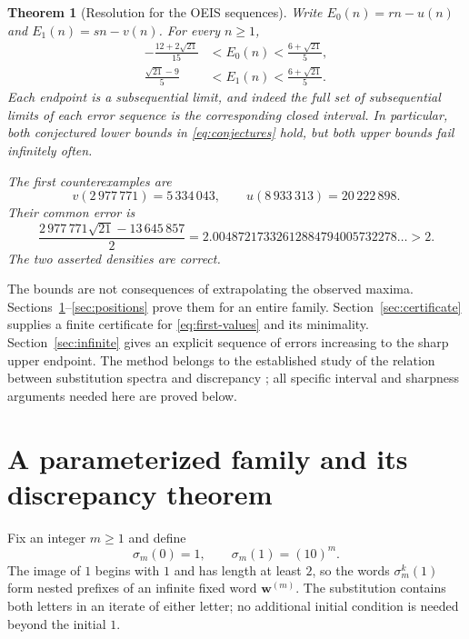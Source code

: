\documentclass[11pt]{article}
\numberwithin{equation}{section}
\newtheorem{theorem}{Theorem}[section]
\theoremstyle{definition}
\theoremstyle{remark}
\newcommand{\word}{\mathbf{w}}
\begin{document}
\begin{theorem}[Resolution for the OEIS sequences]\label{thm:original}
Write $E_0(n)=rn-u(n)$ and $E_1(n)=sn-v(n)$. For every $n\ge1$,
\begin{align}
-\frac{12+2\sqrt{21}}{15}&<E_0(n)<\frac{6+\sqrt{21}}5,\label{eq:zero3}\\
\frac{\sqrt{21}-9}{5}&<E_1(n)<\frac{6+\sqrt{21}}5.\label{eq:one3}
\end{align}
Each endpoint is a subsequential limit, and indeed the full set of
subsequential limits of each error sequence is the corresponding closed
interval. In particular, both conjectured lower bounds in
\eqref{eq:conjectures} hold, but both upper bounds fail infinitely often.

The first counterexamples are
\begin{equation}\label{eq:first-values}
v(2\,977\,771)=5\,334\,043,\qquad
u(8\,933\,313)=20\,222\,898.
\end{equation}
Their common error is
\begin{equation}\label{eq:common-error}
\frac{2\,977\,771\sqrt{21}-13\,645\,857}{2}
=2.00487217332612884794005732278\ldots>2.
\end{equation}
The two asserted densities are correct.
\end{theorem}

The bounds are not consequences of extrapolating the observed maxima.
Sections~\ref{sec:family}--\ref{sec:positions} prove them for an entire
family. Section~\ref{sec:certificate} supplies a finite certificate for
\eqref{eq:first-values} and its minimality. Section~\ref{sec:infinite}
gives an explicit sequence of errors increasing to the sharp upper
endpoint. The method belongs to the established study of the relation
between substitution spectra and discrepancy \cite{adamczewski}; all
specific interval and sharpness arguments needed here are proved below.

\section{A parameterized family and its discrepancy theorem}\label{sec:family}

Fix an integer $m\ge1$ and define
\begin{equation}\label{eq:family-sub}
\sigma_m(0)=1,\qquad \sigma_m(1)=(10)^m.
\end{equation}
The image of $1$ begins with $1$ and has length at least $2$, so the words
$\sigma_m^k(1)$ form nested prefixes of an infinite fixed word
$\word^{(m)}$. The substitution contains both letters in an iterate of
either letter; no additional initial condition is needed beyond the
initial $1$.
\end{document}
